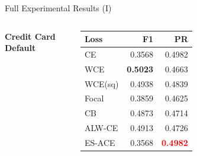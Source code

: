 \documentclass[aspectratio=169]{beamer}
\renewcommand{\textbf}[1]{\textcolor{SejongBlue}{\sf\bfseries #1}}
\begin{document}
\begin{frame}{Full Experimental Results (I)}
\begin{columns}[T, totalwidth=\textwidth]
\vspace{0.8em}

\textbf{Credit Card Default}
\begin{tabular}{lrr}
\toprule
Loss & F1 & PR \\
\midrule
CE & 0.3568 & 0.4982 \\
WCE & \textcolor{SejongBlue}{\textbf{0.5023}} & 0.4663 \\
WCE(sq) & 0.4938 & 0.4839 \\
Focal & 0.3859 & 0.4625 \\
CB & 0.4873 & 0.4714 \\
\textcolor{SejongBlue}{ALW-CE} & 0.4913 & 0.4726 \\
\textcolor{SejongBlue}{ES-ACE} & 0.3568 & \textcolor{red}{\textbf{0.4982}} \\
\bottomrule
\end{tabular}

\end{columns}
\end{frame}
\end{document}
